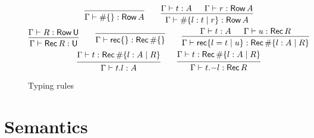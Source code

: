\begin{figure}
\begin{gather*}
\begin{prooftree}
      \infer0{\Gamma \vdash \# \{ \} : \RowType A}
    \end{prooftree}
    \qquad
    \begin{prooftree}
      \hypo{\Gamma \vdash t : A}
      \hypo{\Gamma \vdash r : \RowType A}
      \infer2{\Gamma \vdash \# \{ l : t \mid r \} : \RowType A}
    \end{prooftree}
    \\
    \begin{prooftree}
      \hypo{\Gamma \vdash R : \RowType \Univ}
      \infer1{\Gamma \vdash \RecordType R : \Univ}
    \end{prooftree}
    \qquad
    \begin{prooftree}
      \infer0{\Gamma \vdash \RecordLit \{ \} : \RecordType \# \{ \}}
    \end{prooftree}
    \qquad
    \begin{prooftree}
      \hypo{\Gamma \vdash t : A}
      \hypo{\Gamma \vdash u : \RecordType R}
      \infer2{\Gamma \vdash \RecordLit \{ l = t \mid u \}
        : \RecordType \# \{ l : A \mid R \}}
    \end{prooftree}
    \\
    \begin{prooftree}
      \hypo{\Gamma \vdash t : \RecordType \# \{ l : A \mid R \}}
      \infer1{\Gamma \vdash t.l : A}
    \end{prooftree}
    \qquad
    \begin{prooftree}
      \hypo{\Gamma \vdash t : \RecordType \# \{ l : A \mid R \}}
      \infer1{\Gamma \vdash t \RecordRestr l : \RecordType R}
    \end{prooftree}
  \end{gather*}
  \caption{Typing rules}\label{fig:typing}
\end{figure}

\section{Semantics}

